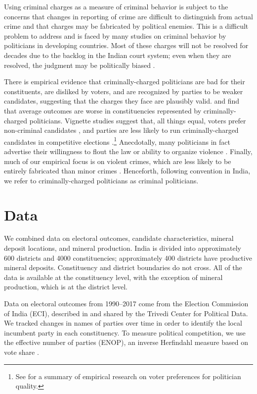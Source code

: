\documentclass[12pt,letterpaper]{article}
\begin{document}
Using criminal charges as a measure of criminal behavior is subject to
the concerns that changes in reporting of crime are difficult to
distinguish from actual crime and that charges may be fabricated by
political enemies. This is a difficult problem to address and is faced
by many studies on criminal behavior by politicians in developing
countries. Most of these charges will not be resolved for decades due
to the backlog in the Indian court system; even when they are
resolved, the judgment may be politically biased
\cite{poblete2019}.

There is empirical evidence that criminally-charged politicians are
bad for their constituents, are disliked by voters, and are recognized
by parties to be weaker candidates, suggesting that the charges they
face are plausibly valid.  and
 find that average outcomes are worse in
constituencies represented by criminally-charged politicians. Vignette
studies suggest that, all things equal, voters prefer non-criminal
candidates \cite{Banerjee2012b,Chauchard2014a}, and parties are less
likely to run criminally-charged candidates in competitive elections
\cite{shaukat2018}.\footnote{See  for a summary
  of empirical research on voter preferences for politician quality.}
Anecdotally, many politicians in fact advertise their willingness to
flout the law or ability to organize violence
\cite{Vaishnav2017}. Finally, much of our empirical focus is on
violent crimes, which are less likely to be entirely fabricated than
minor crimes \cite{iyer2012}. Henceforth, following convention in
India, we refer to criminally-charged politicians as criminal
politicians.

\section{Data}
\label{sec:data}

We combined data on electoral outcomes, candidate characteristics,
mineral deposit locations, and mineral production. India is divided
into approximately 600 districts and 4000 constituencies;
approximately 400 districts have productive mineral
deposits. Constituency and district boundaries do not cross. All of
the data is available at the constituency level, with the exception of
mineral production, which is at the district level.

Data on electoral outcomes from 1990--2017 come from the Election
Commission of India (ECI), described in 
and shared by the Trivedi Center for Political Data. We tracked
changes in names of parties over time in order to identify the local
incumbent party in each constituency.  To measure political
competition, we use the effective number of parties (ENOP), an inverse
Herfindahl measure based on vote share \cite{Laakso1979}.
\end{document}
